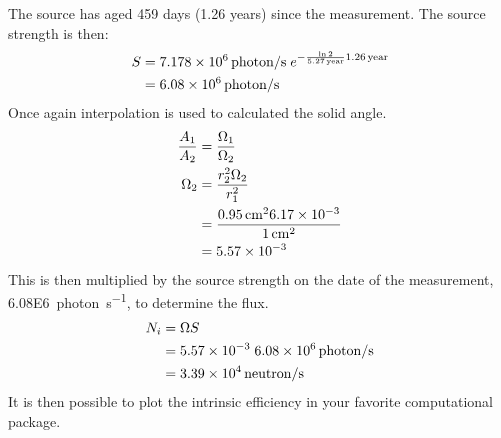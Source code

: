 \documentclass[draftcls,onecolumn]{IEEEtran}
\begin{document}
\begin{Exercise*}[label={LiBorateGlass},title={Li borate glass},name={Example}]
The  source has aged 459 days (1.26 years) since the measurement.
The source strength is then:
\begin{align}
  S &= \SI{7.178E6}{photon\per\second}\;e^{-\frac{ \ln{2}}{\SI{5.27}{year}}\SI{1.26}{year}} \\ \notag
    &= \SI{6.08E6}{photon\per\second}
\end{align}
Once again interpolation is used to calculated the solid angle.
\begin{align*}
	\frac{A_1}{A_2} &= \frac{\Omega_1}{\Omega_2} \\ \notag
	\Omega_2 &= \frac{r_2^2 \Omega_2}{r_1^2} \\
	 &= \frac{\SI{0.95}{\cm}^2 \num{6.17E-3}}{\SI{1}{\cm}^2} \\
	 &= \num{5.57E-3}
\end{align*}
This is then multiplied by the source strength on the date of the measurement, \SI{6.08E6}{photon\per\second}, to determine the flux.
\begin{align*}
 	N_i &= \Omega S \\
	 &= \num{5.57E-3} \; \SI{6.08E6}{photon\per\second} \\
      &= \SI{3.39E4}{neutron\per\second}
\end{align*}
It is then possible to plot the intrinsic efficiency in your favorite computational package.

\end{Exercise*}
\end{document}
